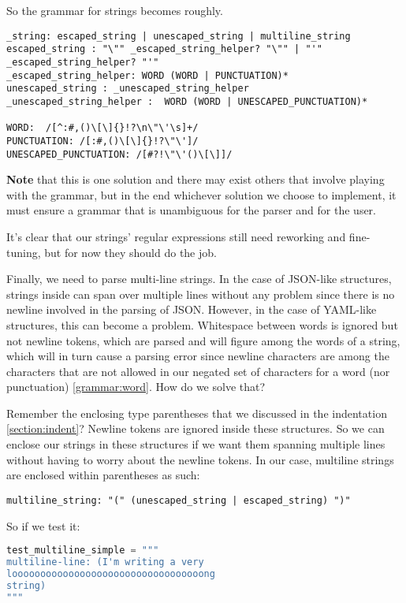 \documentclass[12pt]{article}
\begin{document}
So the grammar for strings becomes roughly.

\begin{lstlisting}
_string: escaped_string | unescaped_string | multiline_string
escaped_string : "\"" _escaped_string_helper? "\"" | "'" _escaped_string_helper? "'"
_escaped_string_helper: WORD (WORD | PUNCTUATION)*
unescaped_string : _unescaped_string_helper
_unescaped_string_helper :  WORD (WORD | UNESCAPED_PUNCTUATION)*

WORD:  /[^:#,()\[\]{}!?\n\"\'\s]+/
PUNCTUATION: /[:#,()\[\]{}!?\"\']/
UNESCAPED_PUNCTUATION: /[#?!\"\'()\[\]]/
\end{lstlisting}

\textbf{Note} that this is one solution and there may exist others that involve playing with the grammar, but in the end whichever solution we choose to implement, it must ensure a grammar that is unambiguous for the parser and for the user. 

It's clear that our strings' regular expressions still need reworking and fine-tuning, but for now they should do the job.

Finally, we need to parse multi-line strings. In the case of JSON-like structures, strings inside can span over multiple lines without any problem since there is no newline involved in the parsing of JSON. However, in the case of YAML-like structures, this can become a problem. Whitespace between words is ignored but not newline tokens, which are parsed and will figure among the words of a string, which will in turn cause a parsing error since newline characters are among the characters that are not allowed in our negated set of characters for a word (nor punctuation) \ref{grammar:word}. How do we solve that?

Remember the enclosing type parentheses that we discussed in the indentation \ref{section:indent}? Newline tokens are ignored inside these structures. So we can enclose our strings in these structures if we want them spanning multiple lines without having to worry about the newline tokens. In our case, multiline strings are enclosed within parentheses as such:
\begin{lstlisting}
multiline_string: "(" (unescaped_string | escaped_string) ")"
\end{lstlisting}

So if we test it:
\begin{lstlisting}[language=Python]
test_multiline_simple = """
multiline-line: (I'm writing a very 
loooooooooooooooooooooooooooooooooong
string)
"""
\end{lstlisting}
\end{document}
